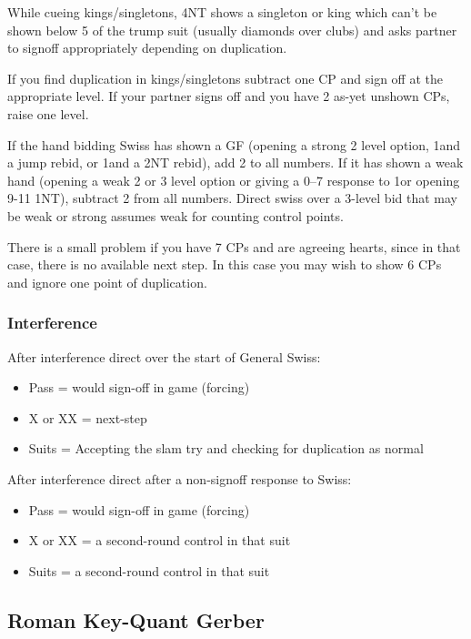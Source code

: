 \documentclass[a4paper,14pt]{extarticle}
\begin{document}
While cueing kings/singletons, 4NT shows a singleton or king which can't be
shown below 5 of the trump suit (usually diamonds over clubs) and asks partner
to signoff appropriately depending on duplication.

If you find duplication in kings/singletons subtract one CP and sign off at the
appropriate level. If your partner signs off and you have 2 as-yet unshown CPs,
raise one level.

If the hand bidding Swiss has shown a GF (opening a strong 2 level option,
1\diamonds and a jump rebid, or 1\diamonds and a 2NT rebid), add 2 to
all numbers. If it has shown a weak hand (opening a weak 2 or 3 level option or
giving a 0--7 response to 1\diamonds or opening 9-11 1NT), subtract 2 from
all numbers. Direct swiss over a 3-level bid that may be weak or strong assumes
weak for counting control points.

There is a small problem if you have 7 CPs and are agreeing hearts, since in
that case, there is no available next step. In this case you may wish to show
6 CPs and ignore one point of duplication.

\subsubsection{Interference}

After interference direct over the start of General Swiss:

\begin{itemize}
	\item Pass = would sign-off in game (forcing)
	\item X or XX = next-step
	\item Suits = Accepting the slam try and checking for duplication as normal
\end{itemize}

After interference direct after a non-signoff response to Swiss:

\begin{itemize}
	\item Pass = would sign-off in game (forcing)
	\item X or XX = a second-round control in that suit
	\item Suits = a second-round control in that suit
\end{itemize}

\subsection{Roman Key-Quant Gerber}
\label{sec:rkqg}
\label{note:22}
\end{document}
